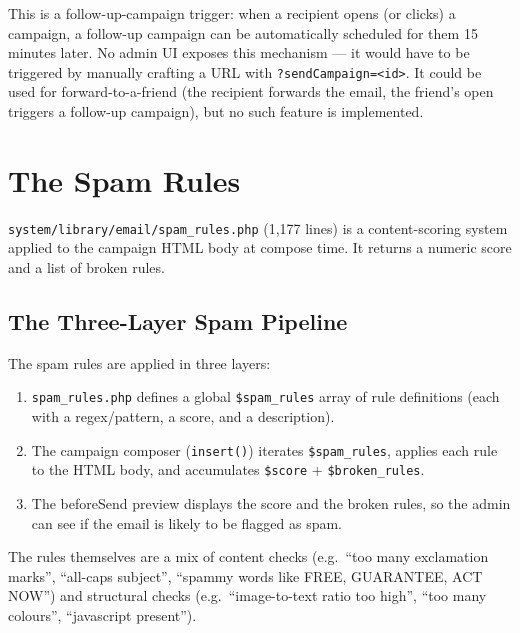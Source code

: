 \documentclass[11pt,a4paper]{article}
\begin{document}
This is a follow-up-campaign trigger: when a recipient opens (or
clicks) a campaign, a follow-up campaign can be automatically
scheduled for them 15 minutes later. No admin UI exposes this
mechanism --- it would have to be triggered by manually crafting
a URL with \texttt{?sendCampaign=<id>}. It could be used for
forward-to-a-friend (the recipient forwards the email, the
friend's open triggers a follow-up campaign), but no such feature
is implemented.

\section{The Spam Rules}\label{sec:spam}

\texttt{system/library/email/spam\_rules.php} (1,177 lines) is a
content-scoring system applied to the campaign HTML body at
compose time. It returns a numeric score and a list of broken
rules.

\subsection{The Three-Layer Spam Pipeline}

\begin{findingbox}
The spam rules are applied in three layers:

\begin{enumerate}[leftmargin=1.6em,itemsep=2pt]
  \item \texttt{spam\_rules.php} defines a global
        \texttt{\$spam\_rules} array of rule definitions (each
        with a regex/pattern, a score, and a description).
  \item The campaign composer (\texttt{insert()}) iterates
        \texttt{\$spam\_rules}, applies each rule to the HTML
        body, and accumulates \texttt{\$score} +
        \texttt{\$broken\_rules}.
  \item The beforeSend preview displays the score and the broken
        rules, so the admin can see if the email is likely to be
        flagged as spam.
\end{enumerate}

The rules themselves are a mix of content checks (e.g.\ ``too
many exclamation marks'', ``all-caps subject'', ``spammy words
like FREE, GUARANTEE, ACT NOW'') and structural checks (e.g.\
``image-to-text ratio too high'', ``too many colours'',
``javascript present'').
\end{findingbox}
\end{document}
